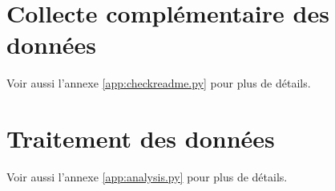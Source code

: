 \section{Collecte complémentaire des données}
\label{sec:collectreadme}

Voir aussi l'annexe \ref{app:checkreadme.py} pour plus de détails.


\section{Traitement des données}

Voir aussi l'annexe \ref{app:analysis.py} pour plus de détails.

